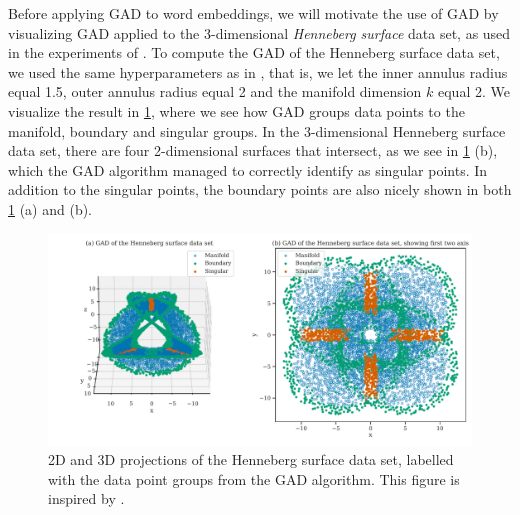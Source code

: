 Before applying GAD to word embeddings, we will motivate the use of GAD by visualizing GAD applied to the 3-dimensional \textit{Henneberg surface} data set, as used in the experiments of \cite{stolz2020geometric}. To compute the GAD of the Henneberg surface data set, we used the same hyperparameters as in \cite{stolz2020geometric}, that is, we let the inner annulus radius equal 1.5, outer annulus radius equal 2 and the manifold dimension $k$ equal 2. We visualize the result in \cref{fig:gad-henneberg-3d}, where we see how GAD groups data points to the manifold, boundary and singular groups. In the 3-dimensional Henneberg surface data set, there are four 2-dimensional surfaces that intersect, as we see in \cref{fig:gad-henneberg-3d} (b), which the GAD algorithm managed to correctly identify as singular points. In addition to the singular points, the boundary points are also nicely shown in both \cref{fig:gad-henneberg-3d} (a) and (b).
\begin{figure}[H]
    \centering
    \includegraphics[width=\textwidth]{thesis/figures/gad-henneberg-3d.pdf}
    \caption{2D and 3D projections of the Henneberg surface data set, labelled with the data point groups from the GAD algorithm. This figure is inspired by \cite[Figure 3]{stolz2020geometric}.}
    \label{fig:gad-henneberg-3d}
\end{figure}

